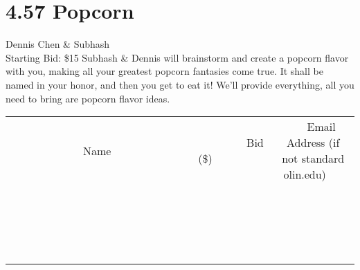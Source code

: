 \documentclass[11pt]{article}
\begin{document}
\section*{4.57 Popcorn }
Dennis Chen \& Subhash
\\
Starting Bid: \$15
\newline
Subhash \& Dennis will brainstorm and create a popcorn flavor with you, making all your greatest popcorn fantasies come true. It shall be named in your honor, and then you get to eat it! We'll provide everything, all you need to bring are popcorn flavor ideas.
\\[3ex]
\begin{tabular}{c c c}
~~~~~~~~~~~~~Name~~~~~~~~~~~~~ & ~~~~~~~~~Bid (\$)~~~~~~~~~  & ~~~Email Address (if not standard olin.edu)~~~\\
 & & \\
\hline
 & & \\
\hline
 & & \\
\hline
 & & \\
\hline
 & & \\
\hline
 & & \\
\hline
 & & \\
\hline
 & & \\
\hline
 & & \\
\hline
 & & \\
\hline
 & & \\
\hline
 & & \\
\hline
 & & \\
\hline
 & & \\
\hline
 & & \\
\hline
 & & \\
\hline
 & & \\
\hline
 & & \\
\hline
 & & \\
\hline
\end{tabular}
\newpage
\end{document}
